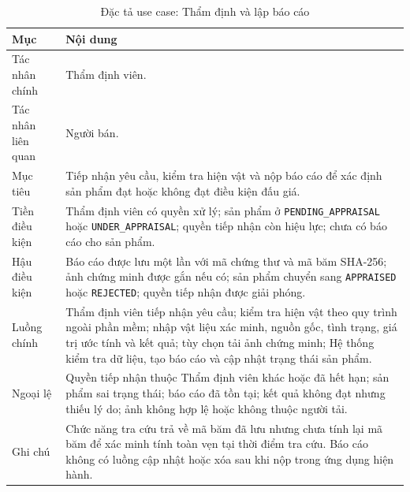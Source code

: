 \documentclass[../DoAn.tex]{subfiles}
\begin{document}
\begin{table}[htbp]
    \centering
    \caption{Đặc tả use case: Thẩm định và lập báo cáo}
    \label{tab:appendix-uc-submit-appraisal-report}
    \footnotesize
    \setlength{\tabcolsep}{4pt}
    \renewcommand{\arraystretch}{1.05}
    \begin{tabular}{|>{\raggedright\arraybackslash}p{}|>{\raggedright\arraybackslash}p{}|}
        \hline
        \textbf{Mục} & \textbf{Nội dung} \\
        \hline
        Tác nhân chính & Thẩm định viên. \\
        \hline
        Tác nhân liên quan & Người bán. \\
        \hline
        Mục tiêu & Tiếp nhận yêu cầu, kiểm tra hiện vật và nộp báo cáo để xác định sản phẩm đạt hoặc không đạt điều kiện đấu giá. \\
        \hline
        Tiền điều kiện & Thẩm định viên có quyền xử lý; sản phẩm ở \texttt{PENDING\_APPRAISAL} hoặc \texttt{UNDER\_APPRAISAL}; quyền tiếp nhận còn hiệu lực; chưa có báo cáo cho sản phẩm. \\
        \hline
        Hậu điều kiện & Báo cáo được lưu một lần với mã chứng thư và mã băm SHA-256; ảnh chứng minh được gắn nếu có; sản phẩm chuyển sang \texttt{APPRAISED} hoặc \texttt{REJECTED}; quyền tiếp nhận được giải phóng. \\
        \hline
        Luồng chính & Thẩm định viên tiếp nhận yêu cầu; kiểm tra hiện vật theo quy trình ngoài phần mềm; nhập vật liệu xác minh, nguồn gốc, tình trạng, giá trị ước tính và kết quả; tùy chọn tải ảnh chứng minh; Hệ thống kiểm tra dữ liệu, tạo báo cáo và cập nhật trạng thái sản phẩm. \\
        \hline
        Ngoại lệ & Quyền tiếp nhận thuộc Thẩm định viên khác hoặc đã hết hạn; sản phẩm sai trạng thái; báo cáo đã tồn tại; kết quả không đạt nhưng thiếu lý do; ảnh không hợp lệ hoặc không thuộc người tải. \\
        \hline
        Ghi chú & Chức năng tra cứu trả về mã băm đã lưu nhưng chưa tính lại mã băm để xác minh tính toàn vẹn tại thời điểm tra cứu. Báo cáo không có luồng cập nhật hoặc xóa sau khi nộp trong ứng dụng hiện hành. \\
        \hline
    \end{tabular}
\end{table}
\end{document}
